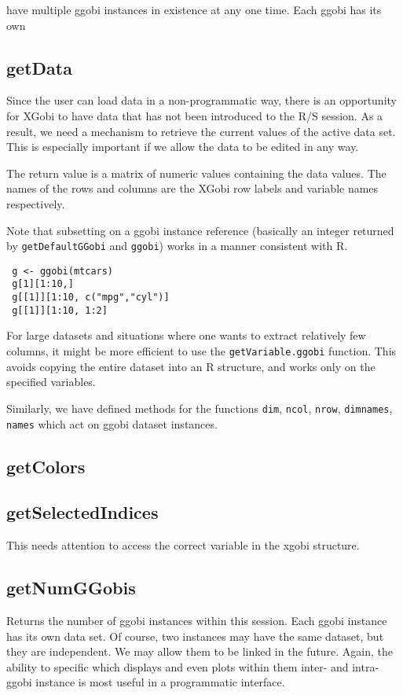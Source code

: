 \documentclass{article}
\def\SFunction#1{{\texttt{\red #1}}}
\begin{document}
have multiple ggobi
instances in existence at any one time.
Each ggobi has its own


\subsection{getData}
Since the user can load data in a non-programmatic way, there is an
opportunity for XGobi to have data that has not been introduced to the
R/S session.  As a result, we need a mechanism to retrieve the current
values of the active data set.  This is especially important if we
allow the data to be edited in any way.

The return value is a matrix of numeric values containing the data
values.  The names of the rows and columns are the XGobi row labels
and variable names respectively.

Note that subsetting on a ggobi instance reference (basically an
integer returned by \SFunction{getDefaultGGobi} and \SFunction{ggobi})
works in a manner consistent with R.
\begin{verbatim}
 g <- ggobi(mtcars)
 g[1][1:10,]
 g[[1]][1:10, c("mpg","cyl")]
 g[[1]][1:10, 1:2]
\end{verbatim}
For large datasets and situations where one wants to extract
relatively few columns, it might be more efficient to use the
\SFunction{getVariable.ggobi} function.
This avoids copying the entire dataset into an R structure,
and works only on the specified variables.

Similarly, we have defined methods for the functions \SFunction{dim},
\SFunction{ncol}, \SFunction{nrow}, \SFunction{dimnames},
\SFunction{names} which act on ggobi dataset instances.


\subsection{getColors}


\subsection{getSelectedIndices}
This needs attention to access the correct
variable in the xgobi structure.


\subsection{getNumGGobis}
Returns the number of ggobi instances within this session.  Each ggobi
instance has its own data set. Of course, two instances may have the
same dataset, but they are independent.  We may allow them to be
linked in the future.  Again, the ability to specific which displays
and even plots within them inter- and intra- ggobi instance is most
useful in a programmatic interface.
\end{document}
